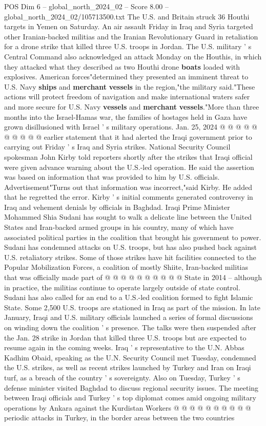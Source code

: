 \begin{textsample}{POS Dim 6 – global\_north\_2024\_02 – Score 8.00 – global\_north\_2024\_02/105713500.txt}
The U.S. and Britain struck 36 Houthi targets in Yemen on Saturday.
An air assault Friday in Iraq and Syria targeted other Iranian-backed militias and the Iranian Revolutionary Guard in retaliation for a drone strike that killed three U.S. troops in Jordan.
The U.S. military ' s Central Command also acknowledged an attack Monday on the Houthis, in which they attacked what they described as two Houthi drone \textbf{boats} loaded with explosives.
American forces"determined they presented an imminent threat to U.S.
Navy \textbf{ships} and \textbf{merchant} \textbf{vessels} in the region,"the military said."These actions will protect freedom of navigation and make international waters safer and more secure for U.S.
Navy \textbf{vessels} and \textbf{merchant} \textbf{vessels}."More than three months into the Israel-Hamas war, the families of hostages held in Gaza have grown disillusioned with Israel ' s military operations.
Jan. 25, 2024 @ @ @ @ @ @ @ @ @ @ earlier statement that it had alerted the Iraqi government prior to carrying out Friday ' s Iraq and Syria strikes.
National Security Council spokesman John Kirby told reporters shortly after the strikes that Iraqi official were given advance warning about the U.S.-led operation.
He said the assertion was based on information that was provided to him by U.S. officials.
Advertisement"Turns out that information was incorrect,"said Kirby.
He added that he regretted the error.
Kirby ' s initial comments generated controversy in Iraq and vehement denials by officials in Baghdad.
Iraqi Prime Minister Mohammed Shia Sudani has sought to walk a delicate line between the United States and Iran-backed armed groups in his country, many of which have associated political parties in the coalition that brought his government to power.
Sudani has condemned attacks on U.S. troops, but has also pushed back against U.S. retaliatory strikes.
Some of those strikes have hit facilities connected to the Popular Mobilization Forces, a coalition of mostly Shiite, Iran-backed militias that was officially made part of @ @ @ @ @ @ @ @ @ @ State in 2014 -- although in practice, the militias continue to operate largely outside of state control.
Sudani has also called for an end to a U.S.-led coalition formed to fight Islamic State.
Some 2,500 U.S. troops are stationed in Iraq as part of the mission.
In late January, Iraqi and U.S. military officials launched a series of formal discussions on winding down the coalition ' s presence.
The talks were then suspended after the Jan. 28 strike in Jordan that killed three U.S. troops but are expected to resume again in the coming weeks.
Iraq ' s representative to the U.N.
Abbas Kadhim Obaid, speaking as the U.N.
Security Council met Tuesday, condemned the U.S. strikes, as well as recent strikes launched by Turkey and Iran on Iraqi turf, as a breach of the country ' s sovereignty.
Also on Tuesday, Turkey ' s defense minister visited Baghdad to discuss regional security issues.
The meeting between Iraqi officials and Turkey ' s top diplomat comes amid ongoing military operations by Ankara against the Kurdistan Workers @ @ @ @ @ @ @ @ @ @ periodic attacks in Turkey, in the border areas between the two countries


\end{textsample}
